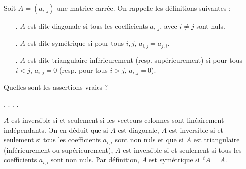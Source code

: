 \begin{question}
Soit $ A=(a_{i,j})$ une matrice carrée. On rappelle les définitions suivantes :
\begin{enumerate}
\item[.] $A$ est dite diagonale si tous les coefficients $a_{i,j}$, avec $i\neq j$ sont nuls.
\item[.] $A$ est dite symétrique si pour tous $i,j$, $a_{i,j}=a_{j,i}$.
\item[.] $A$ est dite triangulaire inférieurement (resp. supérieurement) si pour tous $i<j$, $a_{i,j}=0$ (resp. pour tous $i>j$, $a_{i,j}=0$).
\end{enumerate}
Quelles sont les assertions vraies ?
\begin{answers}  
.
.
.
.
\end{answers}
\begin{explanations} $A$ est inversible si et seulement si les vecteurs colonnes sont linéairement indépendants. On en déduit que 
si $A$ est diagonale, $A$ est inversible si et seulement si tous les coefficients $a_{i,i}$ sont non nuls et que si $A$ est triangulaire (inférieurement ou supérieurement), $A$ est inversible si et seulement si tous les coefficients $a_{i,i}$ sont non nuls. Par définition, $A$ est symétrique si $\, ^tA=A$.
\end{explanations}
\end{question}

